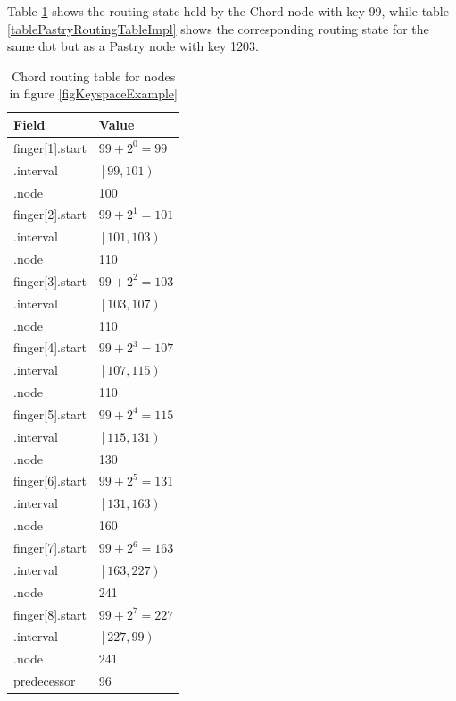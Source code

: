 Table \ref{tableChordRoutingTableImpl} shows the routing state held by the Chord node with key 99, while table \ref{tablePastryRoutingTableImpl} shows the corresponding routing state for the same dot but as a Pastry node with key 1203.

\begin{table}[!htb]
\caption{Chord routing table for nodes in figure \ref{figKeyspaceExample}}
\begin{center}
\begin{tabular}{ | l | l | }
  \hline                       
  Field & Value \\
  \hline  
  \hline  
  finger[1].start & $ 99 + 2^{0} = 99 $ \\
  \hline  
  \;.interval & $ \left[ 99, 101 \right) $ \\
  \hline  
  \;.node & 100 \\
  \hline  
  finger[2].start & $ 99 + 2^{1} = 101 $ \\
  \hline  
  \;.interval & $ \left[ 101, 103 \right) $ \\
  \hline  
  \;.node & 110 \\
  \hline  
  finger[3].start & $ 99 + 2^{2} = 103 $ \\
  \hline  
  \;.interval & $ \left[ 103, 107 \right) $ \\
  \hline  
  \;.node & 110 \\
  \hline  
  finger[4].start & $ 99 + 2^{3} = 107 $ \\
  \hline  
  \;.interval & $ \left[ 107, 115 \right) $ \\
  \hline  
  \;.node & 110 \\
  \hline  
  finger[5].start & $ 99 + 2^{4} = 115 $ \\
  \hline  
  \;.interval & $ \left[ 115, 131 \right) $ \\
  \hline  
  \;.node & 130 \\
  \hline  
  finger[6].start & $ 99 + 2^{5} = 131 $ \\
  \hline  
  \;.interval & $ \left[ 131, 163 \right) $ \\
  \hline  
  \;.node & 160 \\
  \hline  
  finger[7].start & $ 99 + 2^{6} = 163 $ \\
  \hline  
  \;.interval & $ \left[ 163, 227 \right) $ \\
  \hline  
  \;.node & 241 \\
  \hline  
  finger[8].start & $ 99 + 2^{7} = 227 $ \\
  \hline  
  \;.interval & $ \left[ 227, 99 \right) $ \\
  \hline
  \;.node & 241 \\
  \hline  
  predecessor & 96 \\
  \hline  
\end{tabular}
\end{center}
\label{tableChordRoutingTableImpl}
\end{table}

